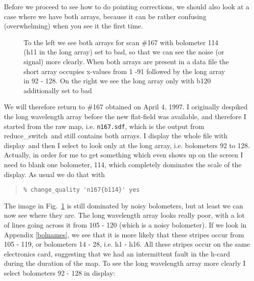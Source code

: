 \documentclass[twoside,11pt]{article}
\newenvironment{myquote}{\begin{quote}\begin{small}}{\end{small}\end{quote}}
\newcommand{\task}[1]{\textsf{#1}}
\newcommand{\resw}{\xref{\task{reduce\_switch}}{sun216}{REDUCE_SWITCH}}
\newcommand{\display}{\xref{\task{display}}{sun95}{DISPLAY}}
\newcommand{\xref}[3]{#1}
\begin{document}
Before we proceed to see how to do pointing corrections, we should
also look at a case where we have both arrays, because it can be rather
confusing (overwhelming) when you see it the first time.


\begin{figure}
\begin{center}
\caption{To the left we see both arrays for scan \#167 with bolometer 114 (h11
in the long array) set to bad, so that we can see the noise (or signal)
more clearly. When both arrays are present in a data file the short array
occupies x-values from 1 -91 followed by the long array in 92 - 128. On
the right we see the long array only with b120 additionally set to bad 
}
\label{fig:scan167}
\end{center}
\end{figure}



We will therefore return to \#167 obtained on April 4, 1997. I originally
despiked the long wavelength array before the new flat-field was available,
and therefore I started from the raw map, i.e. \texttt{n167.sdf}, which is the
output from \resw\ and still contains both arrays. I display the whole file
with \display\ and then I select to look only at the long array,
i.e. bolometers 92 to 128. Actually, in order for me to get something which
even shows up on the screen I need to blank one bolometer, 114, which
completely dominates the scale of the display. As usual we do that with
\begin{myquote} \begin{verbatim}
% change_quality 'n167{b114}' yes
\end{verbatim} \end{myquote}
 The image in Fig.\ \ref{fig:scan167} is still dominated by
noisy bolometers, but at least we can now see where they are.  The long
wavelength array looks really poor, with a lot of lines going across it from
105 - 120 (which is a noisy bolometer). If we look in Appendix \ref{bolnames}, we see that
it is more likely that these stripes occur from 105 - 119, or bolometers 14 -
28, i.e. h1 - h16. All these stripes occur on the same electronics card,
suggesting that we had an intermittent fault in the h-card during the duration
of the map. To see the long wavelength array more clearly I select bolometers
92 - 128 in \display:
\end{document}
